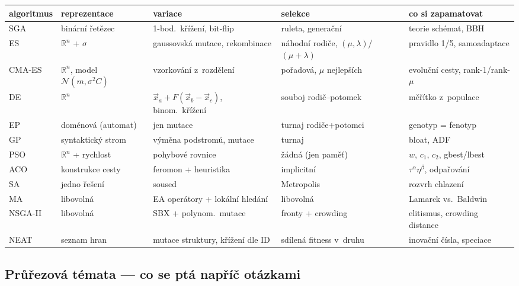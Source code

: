 \documentclass[11pt,a4paper]{article}
\theoremstyle{definition}
\begin{document}
\begin{center}
\small
\begin{tabular}{@{}p{2.5cm}p{2.9cm}p{3.1cm}p{3.1cm}p{3.1cm}@{}}
\toprule
\textbf{algoritmus} & \textbf{reprezentace} & \textbf{variace} &
\textbf{selekce} & \textbf{co si zapamatovat} \\
\midrule
SGA & binární řetězec & 1-bod.\ křížení, bit-flip & ruleta, generační &
  teorie schémat, BBH \\
ES & $\mathbb{R}^n$ + $\sigma$ & gaussovská mutace, rekombinace &
  náhodní rodiče, $(\mu,\lambda)$/$(\mu{+}\lambda)$ & pravidlo 1/5,
  samoadaptace \\
CMA-ES & $\mathbb{R}^n$, model $\mathcal N(m,\sigma^2 C)$ & vzorkování
  z~rozdělení & pořadová, $\mu$ nejlepších & evoluční cesty, rank-1/rank-$\mu$ \\
DE & $\mathbb{R}^n$ & $\vec x_a + F(\vec x_b - \vec x_c)$, binom.\ křížení &
  souboj rodič--potomek & měřítko z~populace \\
EP & doménová (automat) & jen mutace & turnaj rodiče+potomci &
  genotyp = fenotyp \\
GP & syntaktický strom & výměna podstromů, mutace & turnaj &
  bloat, ADF \\
PSO & $\mathbb{R}^n$ + rychlost & pohybové rovnice & žádná (jen paměť) &
  $w$, $c_1$, $c_2$, gbest/lbest \\
ACO & konstrukce cesty & feromon + heuristika & implicitní &
  $\tau^\alpha\eta^\beta$, odpařování \\
SA & jedno řešení & soused & Metropolis & rozvrh chlazení \\
MA & libovolná & EA operátory + lokální hledání & libovolná &
  Lamarck vs.\ Baldwin \\
NSGA-II & libovolná & SBX + polynom.\ mutace & fronty + crowding &
  elitismus, crowding distance \\
NEAT & seznam hran & mutace struktury, křížení dle ID & sdílená fitness
  v~druhu & inovační čísla, speciace \\
\bottomrule
\end{tabular}
\end{center}

\subsection*{Průřezová témata --- co se ptá napříč otázkami}
\end{document}
